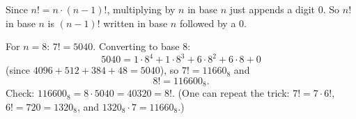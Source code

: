 Since $n!=n\cdot(n-1)!$, multiplying by $n$ in base $n$ just appends a digit $0$. So $n!$ in base $n$ is $(n-1)!$ written in base $n$ followed by a $0$.

For $n=8$: $7!=5040$. Converting to base $8$:
\[
5040=1\cdot8^4+1\cdot8^3+6\cdot8^2+6\cdot8+0
\]
(since $4096+512+384+48=5040$), so $7!=11660_8$ and
\[
8!=\boxed{116600_8}.
\]
Check: $116600_8=8\cdot5040=40320=8!$. (One can repeat the trick: $7!=7\cdot6!$, $6!=720=1320_8$, and $1320_8\cdot7=11660_8$.)
